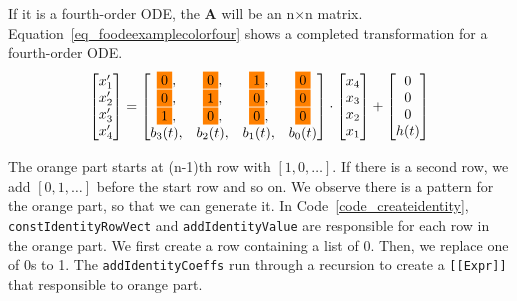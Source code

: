 If it is a fourth-order ODE, the \textbf{A} will be an n$\times$n matrix. Equation~\ref{eq_foodeexamplecolorfour} shows a completed transformation for a fourth-order ODE.
\begin{equation} \label{eq_foodeexamplecolorfour}
	\begin{bmatrix}
		{x_{1}'} \\
    {x_{2}'} \\
    {x_{3}'} \\
    {x_{4}'}
	\end{bmatrix}
    = 
  \begin{bmatrix}
		\highlight{orange}{0}, & \highlight{orange}{0}, & \highlight{orange}{1}, & \highlight{orange}{0} \\
    \highlight{orange}{0}, & \highlight{orange}{1}, & \highlight{orange}{0}, & \highlight{orange}{0} \\
    \highlight{orange}{1}, & \highlight{orange}{0}, & \highlight{orange}{0}, & \highlight{orange}{0} \\
    {b_{3}(t)}, & {b_{2}(t)}, & {b_{1}(t)}, & {b_{0}(t)}
	\end{bmatrix}
    \cdot
  \begin{bmatrix}
		{x_{4}} \\
    {x_{3}} \\
    {x_{2}} \\
    {x_{1}}
	\end{bmatrix}
    + 
  \begin{bmatrix}
    {0} \\
    {0} \\
    {0} \\
    {h(t)}
	\end{bmatrix}
\end{equation}

The orange part starts at (n-1)th row with $[1, 0, \dots]$. If there is a second row, we add $[0, 1, \dots]$ before the start row and so on. We observe there is a pattern for the orange part, so that we can generate it. In Code~\ref{code_createidentity}, \verb|constIdentityRowVect| and \verb|addIdentityValue| are responsible for each row in the orange part. We first create a row containing a list of 0. Then, we replace one of 0s to 1. The \verb|addIdentityCoeffs| run through a recursion to create a \verb|[[Expr]]| that responsible to orange part.


